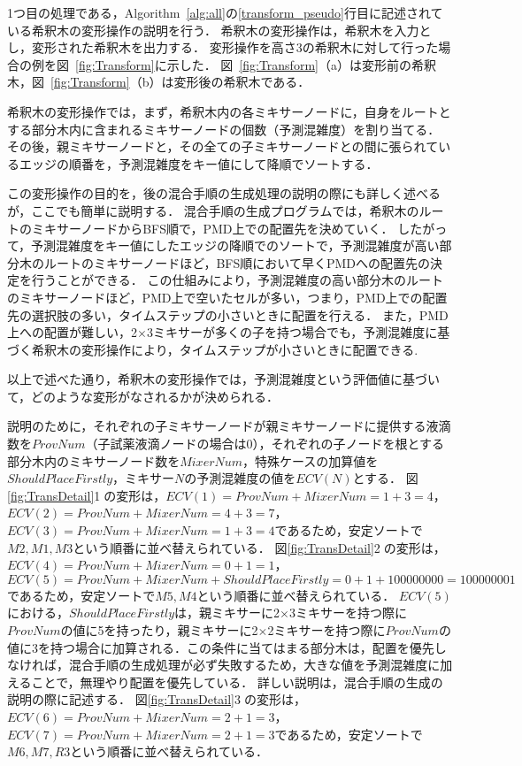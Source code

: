 1つ目の処理である，Algorithm~\ref{alg:all}の\ref{transform_pseudo}行目に記述されている希釈木の変形操作の説明を行う．
希釈木の変形操作は，希釈木を入力とし，変形された希釈木を出力する．
変形操作を高さ3の希釈木に対して行った場合の例を図~\ref{fig:Transform}に示した．
図~\ref{fig:Transform}（a）は変形前の希釈木，図~\ref{fig:Transform}（b）は変形後の希釈木である．

希釈木の変形操作では，まず，希釈木内の各ミキサーノードに，自身をルートとする部分木内に含まれるミキサーノードの個数（予測混雑度）を割り当てる．
その後，親ミキサーノードと，その全ての子ミキサーノードとの間に張られているエッジの順番を，予測混雑度をキー値にして降順でソートする． 

この変形操作の目的を，後の混合手順の生成処理の説明の際にも詳しく述べるが，ここでも簡単に説明する．
混合手順の生成プログラムでは，希釈木のルートのミキサーノードからBFS順で，PMD上での配置先を決めていく．
したがって，予測混雑度をキー値にしたエッジの降順でのソートで，予測混雑度が高い部分木のルートのミキサーノードほど，BFS順において早くPMDへの配置先の決定を行うことができる．
この仕組みにより，予測混雑度の高い部分木のルートのミキサーノードほど，PMD上で空いたセルが多い，つまり，PMD上での配置先の選択肢の多い，タイムステップの小さいときに配置を行える．
また，PMD上への配置が難しい，2$\times$3ミキサーが多くの子を持つ場合でも，予測混雑度に基づく希釈木の変形操作により，タイムステップが小さいときに配置できる.　

以上で述べた通り，希釈木の変形操作では，予測混雑度という評価値に基づいて，どのような変形がなされるかが決められる．

説明のために，それぞれの子ミキサーノードが親ミキサーノードに提供する液滴数を$\mathit{ProvNum}$（子試薬液滴ノードの場合は0），それぞれの子ノードを根とする部分木内のミキサーノード数を$\mathit{MixerNum}$，特殊ケースの加算値を$\mathit{ShouldPlaceFirstly}$，ミキサー$N$の予測混雑度の値を$ECV(N)$とする．
図\ref{fig:TransDetail}\textcircled{\scriptsize 1}の変形は，$ECV(1)=ProvNum+MixerNum=1+3=4$，$ECV(2)=ProvNum+MixerNum=4+3=7$，$ECV(3)=ProvNum+MixerNum=1+3=4$であるため，安定ソートで$M2,M1,M3$という順番に並べ替えられている．
図\ref{fig:TransDetail}\textcircled{\scriptsize 2}の変形は，$ECV(4)=ProvNum+MixerNum=0+1=1$，$ECV(5)=ProvNum+MixerNum+ShouldPlaceFirstly=0+1+100000000=100000001$であるため，安定ソートで$M5,M4$という順番に並べ替えられている．
$ECV(5)$における，$\mathit{ShouldPlaceFirstly}$は，親ミキサーに2$\times$3ミキサーを持つ際に$ProvNum$の値に5を持ったり，親ミキサーに2$\times$2ミキサーを持つ際に$ProvNum$の値に3を持つ場合に加算される．この条件に当てはまる部分木は，配置を優先しなければ，混合手順の生成処理が必ず失敗するため，大きな値を予測混雑度に加えることで，無理やり配置を優先している．
詳しい説明は，混合手順の生成の説明の際に記述する．
図\ref{fig:TransDetail}\textcircled{\scriptsize 3}の変形は，$ECV(6)=ProvNum+MixerNum=2+1=3$，$ECV(7)=ProvNum+MixerNum=2+1=3$であるため，安定ソートで$M6,M7,R3$という順番に並べ替えられている．

